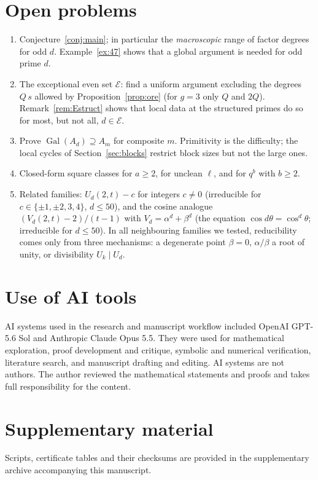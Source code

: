 \documentclass[11pt]{amsart}
\theoremstyle{definition}\newtheorem{definition}[theorem]{Definition}\newtheorem{example}[theorem]{Example}
\theoremstyle{remark}\newtheorem{remark}[theorem]{Remark}
\newcommand{\Gal}{\operatorname{Gal}}\newcommand{\disc}{\operatorname{disc}}\newcommand{\Res}{\operatorname{Res}}
\begin{document}
\section{Open problems}\label{sec:open}
\begin{enumerate}
\item Conjecture~\ref{conj:main}; in particular the \emph{macroscopic} range of factor degrees for odd $d$. Example~\ref{ex:47} shows that a global
argument is needed for odd prime $d$.
\item The exceptional even set $\mathcal E$: find a uniform argument excluding the degrees $Q\,s$ allowed by Proposition~\ref{prop:ore}
(for $g=3$ only $Q$ and $2Q$). Remark~\ref{rem:Estruct} shows that local data at the structured primes do so for most, but not all, $d\in\mathcal E$.
\item Prove $\Gal(A_d)\supseteq A_m$ for composite $m$. Primitivity is the difficulty; the local cycles of Section~\ref{sec:blocks} restrict
block sizes but not the large ones.
\item Closed-form square classes for $a\ge2$, for unclean $\ell$, and for $q^b$ with $b\ge2$.
\item Related families: $U_d(2,t)-c$ for integers $c\ne0$ (irreducible for $c\in\{\pm1,\pm2,3,4\}$, $d\le50$), and the cosine analogue
$(V_d(2,t)-2)/(t-1)$ with $V_d=\alpha^d+\beta^d$ (the equation $\cos d\theta=\cos^d\theta$; irreducible for $d\le50$). In all neighbouring
families we tested, reducibility comes only from three mechanisms: a degenerate point $\beta=0$, $\alpha/\beta$ a root of unity, or
divisibility $U_k\mid U_d$.
\end{enumerate}

\section*{Use of AI tools}
AI systems used in the research and manuscript workflow included OpenAI GPT-5.6 Sol and Anthropic Claude Opus 5.5. They were used for
mathematical exploration, proof development and critique, symbolic and numerical verification, literature search, and manuscript drafting
and editing. AI systems are not authors. The author reviewed the mathematical statements and proofs and takes full responsibility for the
content.

\section*{Supplementary material}
Scripts, certificate tables and their checksums are provided in the supplementary archive accompanying this manuscript.
\end{document}
